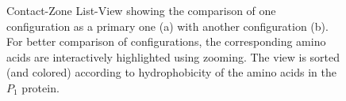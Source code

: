 \documentclass[twocolumn]{bmcart}%
\def\CoZoListView {Contact-Zone List-View\xspace}
\begin{document}
\begin{figure}[tb]
    \centering
    \vspace{-5pt}
    \vspace{-5pt}
    \caption{\CoZoListView showing the comparison of one configuration as a primary one (a) with another configuration (b). For better comparison of configurations, the corresponding amino acids are interactively highlighted using zooming. The view is sorted (and colored) according to hydrophobicity of the amino acids in the $P_1$ protein.}
  \label{fig:list}
\end{figure}
\end{document}
